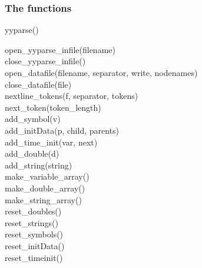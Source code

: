 \documentclass[12pt,a4paper]{report}
\begin{document}
\subsubsection{The functions}
\begin{description}
\item[yyparse()]

\end{description}

\begin{description}
\item[open\_yyparse\_infile(filename)]

\item[close\_yyparse\_infile()]

\item[open\_datafile(filename, separator, write, nodenames)]

\item[close\_datafile(file)]

\item[nextline\_tokens(f, separator, tokens)]

\item[next\_token(token\_length)]

\item[add\_symbol(v)]

\item[add\_initData(p, child, parents)]

\item[add\_time\_init(var, next)]

\item[add\_double(d)]

\item[add\_string(string)]

\item[make\_variable\_array()]

\item[make\_double\_array()]

\item[make\_string\_array()]

\item[reset\_doubles()]

\item[reset\_strings()]

\item[reset\_symbols()]

\item[reset\_initData()]

\item[reset\_timeinit()]


\end{description}
\end{document}
